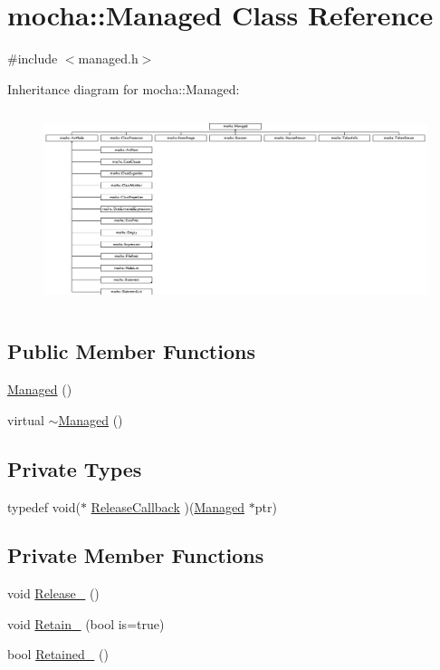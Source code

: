 \hypertarget{classmocha_1_1_managed}{
\section{mocha::Managed Class Reference}
\label{classmocha_1_1_managed}
}


{\ttfamily \#include $<$managed.h$>$}

Inheritance diagram for mocha::Managed:\begin{figure}[H]
\begin{center}
\leavevmode
\includegraphics[height=5.741627cm]{classmocha_1_1_managed}
\end{center}
\end{figure}
\subsection*{Public Member Functions}
\begin{DoxyCompactItemize}
\item 
\hyperlink{classmocha_1_1_managed_afa8739a7d14bd673ff0f3a5d4a3442e3}{Managed} ()
\item 
virtual \hyperlink{classmocha_1_1_managed_a72cdb089c9b59de7ace586992f7bf79e}{$\sim$Managed} ()
\end{DoxyCompactItemize}
\subsection*{Private Types}
\begin{DoxyCompactItemize}
\item 
typedef void($\ast$ \hyperlink{classmocha_1_1_managed_a6f59062ca3a8734842db97c2ae049c0e}{ReleaseCallback} )(\hyperlink{classmocha_1_1_managed}{Managed} $\ast$ptr)
\end{DoxyCompactItemize}
\subsection*{Private Member Functions}
\begin{DoxyCompactItemize}
\item 
void \hyperlink{classmocha_1_1_managed_ac713cec3c957b8b00c70d696bb9f1382}{Release\_\-} ()
\item 
void \hyperlink{classmocha_1_1_managed_acaaf5d0fb9f341adc773fb886cbe843c}{Retain\_\-} (bool is=true)
\item 
bool \hyperlink{classmocha_1_1_managed_af9d99bae00d5d179768eb875f6b1d8a0}{Retained\_\-} ()
\end{DoxyCompactItemize}

